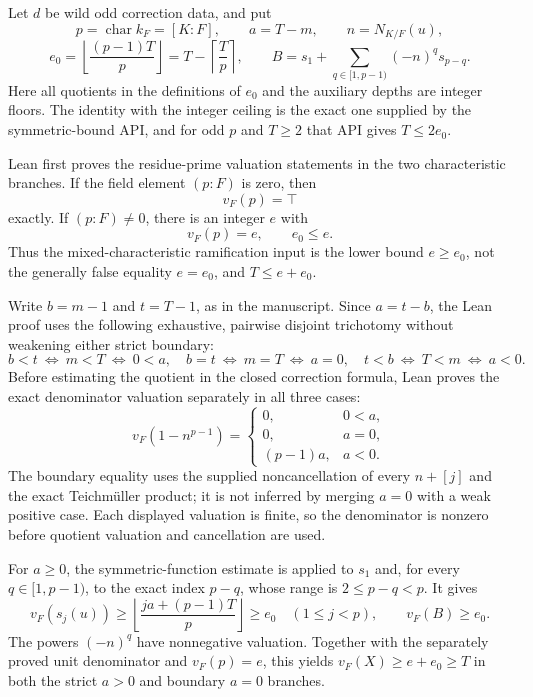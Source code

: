 \begin{theorem}\label{mod:cases-wildodd-correctionvaluation}
Let $d$ be wild odd correction data, and put
\[
 p=\operatorname{char}k_F=[K:F],\qquad
 a=T-m,\qquad n=N_{K/F}(u),
\]
\[
 e_0=\left\lfloor\frac{(p-1)T}{p}\right\rfloor
     =T-\left\lceil\frac Tp\right\rceil,
 \qquad
 B=s_1+\sum_{q\in[1,p-1)}(-n)^q s_{p-q}.
\]
Here all quotients in the definitions of $e_0$ and the auxiliary depths
are integer floors.  The identity with the integer ceiling is the exact
one supplied by the symmetric-bound API, and for odd $p$ and $T\ge2$ that
API gives $T\le2e_0$.

Lean first proves the residue-prime valuation statements in the two
characteristic branches.  If the field element $(p:F)$ is zero, then
\[
 v_F(p)=\top
\]
exactly.  If $(p:F)\ne0$, there is an integer $e$ with
\[
 v_F(p)=e,\qquad e_0\le e.
\]
Thus the mixed-characteristic ramification input is the lower bound
$e\ge e_0$, not the generally false equality $e=e_0$, and
$T\le e+e_0$.

Write $b=m-1$ and $t=T-1$, as in the manuscript.  Since $a=t-b$, the Lean
proof uses the following exhaustive, pairwise disjoint trichotomy without
weakening either strict boundary:
\[
 b<t\ \Longleftrightarrow\ m<T\ \Longleftrightarrow\ 0<a,
\quad
 b=t\ \Longleftrightarrow\ m=T\ \Longleftrightarrow\ a=0,
\quad
 t<b\ \Longleftrightarrow\ T<m\ \Longleftrightarrow\ a<0.
\]
Before estimating the quotient in the closed correction formula, Lean
proves the exact denominator valuation separately in all three cases:
\[
 v_F(1-n^{p-1})=
 \begin{cases}
  0,&0<a,\\
  0,&a=0,\\
  (p-1)a,&a<0.
 \end{cases}
\]
The boundary equality uses the supplied noncancellation of every
$n+[j]$ and the exact Teichm\"uller product; it is not inferred by merging
$a=0$ with a weak positive case.  Each displayed valuation is finite, so
the denominator is nonzero before quotient valuation and cancellation are
used.

For $a\ge0$, the symmetric-function estimate is applied to $s_1$ and,
for every $q\in[1,p-1)$, to the exact index $p-q$, whose range is
$2\le p-q<p$.  It gives
\[
 v_F(s_j(u))\ge
 \left\lfloor\frac{ja+(p-1)T}{p}\right\rfloor\ge e_0
 \quad(1\le j<p),
 \qquad v_F(B)\ge e_0.
\]
The powers $(-n)^q$ have nonnegative valuation.  Together with the
separately proved unit denominator and $v_F(p)=e$, this yields
$v_F(X)\ge e+e_0\ge T$ in both the strict $a>0$ and boundary $a=0$
branches.


\end{theorem}
